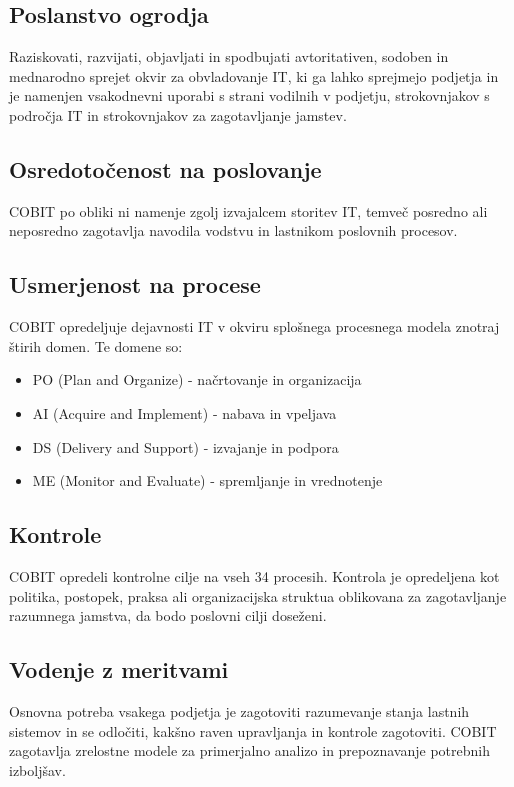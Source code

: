 \documentclass[a4paper,12pt]{report}
\begin{document}
\subsection{Poslanstvo ogrodja}

Raziskovati, razvijati, objavljati in spodbujati avtoritativen, sodoben in
mednarodno sprejet okvir za obvladovanje IT, ki ga lahko sprejmejo
podjetja in je namenjen vsakodnevni uporabi s strani vodilnih v podjetju,
strokovnjakov s področja IT in strokovnjakov za zagotavljanje jamstev.

\subsection{Osredotočenost na poslovanje}
   COBIT po obliki ni namenje zgolj izvajalcem storitev IT, temveč posredno ali neposredno zagotavlja navodila vodstvu in lastnikom poslovnih procesov.

\subsection{Usmerjenost na procese}
   COBIT opredeljuje dejavnosti IT v okviru splošnega procesnega modela znotraj štirih domen. Te domene so:
   \begin{itemize}
      \item PO (Plan and Organize) - načrtovanje in organizacija
      \item AI (Acquire and Implement) - nabava in vpeljava
      \item DS (Delivery and Support) - izvajanje in podpora
      \item ME (Monitor and Evaluate) - spremljanje in vrednotenje
   \end{itemize}

\subsection{Kontrole}
   COBIT opredeli kontrolne cilje na vseh 34 procesih. Kontrola je opredeljena kot politika, postopek, praksa ali organizacijska struktua oblikovana za zagotavljanje razumnega jamstva, da bodo poslovni cilji doseženi.

\subsection{Vodenje z meritvami}
   Osnovna potreba vsakega podjetja je zagotoviti razumevanje stanja lastnih sistemov in se odločiti, kakšno raven upravljanja in kontrole zagotoviti. COBIT zagotavlja zrelostne modele za primerjalno analizo in prepoznavanje potrebnih izboljšav.
\end{document}
